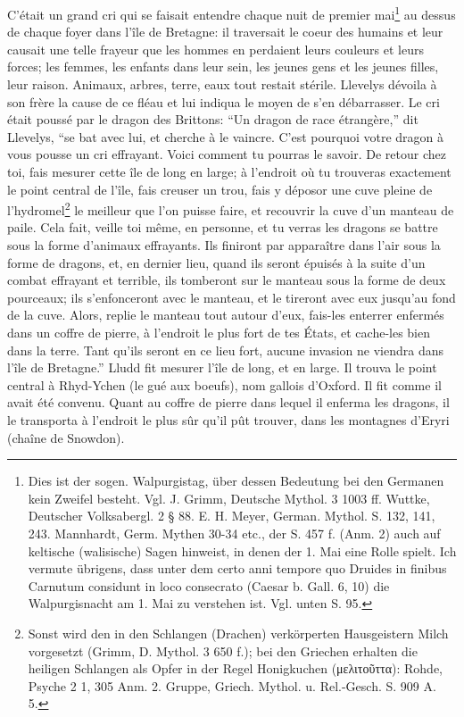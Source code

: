 \documentclass[a4paper, 11pt, oneside]{article}
\begin{document}
C'était un grand cri qui se faisait entendre chaque nuit de premier mai\footnote{Dies ist der sogen. Walpurgistag, über dessen Bedeutung bei den Germanen kein Zweifel besteht. Vgl. J. Grimm, Deutsche Mythol. 3 1003 ff. Wuttke, Deutscher Volksabergl. 2 § 88. E. H. Meyer, German. Mythol. S. 132, 141, 243. Mannhardt, Germ. Mythen 30-34 etc., der S. 457 f. (Anm. 2) auch auf keltische (walisische) Sagen hinweist, in denen der 1. Mai eine Rolle spielt. Ich vermute übrigens, dass unter dem certo anni tempore quo Druides in finibus Carnutum considunt in loco consecrato (Caesar b. Gall. 6, 10) die Walpurgisnacht am 1. Mai zu verstehen ist. Vgl. unten S. 95.} au dessus de chaque foyer dans l'île de Bretagne: il traversait le coeur des humains et leur causait une telle frayeur que les hommes en perdaient leurs couleurs et leurs forces; les femmes, les enfants dans leur sein, les jeunes gens et les jeunes filles, leur raison. Animaux, arbres, terre, eaux tout restait stérile. Llevelys dévoila à son frère la cause de ce fléau et lui indiqua le moyen de s'en débarrasser. Le cri était poussé par le dragon des Brittons: "`Un dragon de race étrangère,"' dit Llevelys, "`se bat avec lui, et cherche à le vaincre. C'est pourquoi votre dragon à vous pousse un cri effrayant. Voici comment tu pourras le savoir. De retour chez toi, fais mesurer cette île de long en large; à l'endroit où tu trouveras exactement le point central de l'île, fais creuser un trou, fais y déposor une cuve pleine de l'hydromel\footnote{Sonst wird den in den Schlangen (Drachen) verkörperten Hausgeistern Milch vorgesetzt (Grimm, D. Mythol. 3 650 f.); bei den Griechen erhalten die heiligen Schlangen als Opfer in der Regel Honigkuchen (μελιτοῦττα): Rohde, Psyche 2 1, 305 Anm. 2. Gruppe, Griech. Mythol. u. Rel.-Gesch. S. 909 A. 5.} le meilleur que l'on puisse faire, et recouvrir la cuve d'un manteau de paile. Cela fait, veille toi même, en personne, et tu verras les dragons se battre sous la forme d'animaux effrayants. Ils finiront par apparaître dans l'air sous la forme de dragons, et, en dernier lieu, quand ils seront épuisés à la suite d'un combat effrayant et terrible, ils tomberont sur le manteau sous la forme de deux pourceaux; ils s'enfonceront avec le manteau, et le tireront avec eux jusqu'au fond de la cuve. Alors, replie le manteau tout autour d'eux, fais-les enterrer enfermés dans un coffre de pierre, à l'endroit le plus fort de tes États, et cache-les bien dans la terre. Tant qu'ils seront en ce lieu fort, aucune invasion ne viendra dans l'île de Bretagne."' Lludd fit mesurer l'île de long, et en large. Il trouva le point central à Rhyd-Ychen (le gué aux boeufs), nom gallois d'Oxford. Il fit comme il avait été convenu. Quant au coffre de pierre dans lequel il enferma les dragons, il le transporta à l'endroit le plus sûr qu'il pût trouver, dans les montagnes d'Eryri (chaîne de Snowdon).
\end{document}
